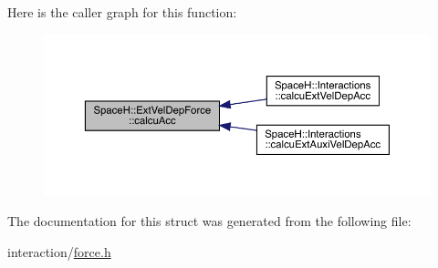 Here is the caller graph for this function\+:
\nopagebreak
\begin{figure}[H]
\begin{center}
\leavevmode
\includegraphics[width=350pt]{struct_space_h_1_1_ext_vel_dep_force_a58775894138f5ebd1d7d7460183f6c1e_icgraph}
\end{center}
\end{figure}


The documentation for this struct was generated from the following file\+:\begin{DoxyCompactItemize}
\item 
interaction/\mbox{\hyperlink{force_8h}{force.\+h}}\end{DoxyCompactItemize}
